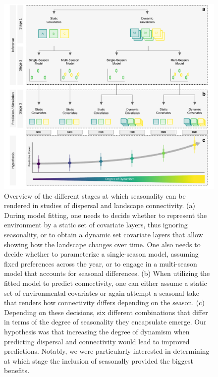 \documentclass[../FinalThesis.tex]{subfiles}
\begin{document}
\begin{figure}[htpb]
 \begin{center}
  \includegraphics[width = \textwidth]{Figures/GraphicalAbstract.pdf}
  \caption{Overview of the different stages at which seasonality can be rendered
  in studies of dispersal and landscape connectivity. (a) During model fitting,
  one needs to decide whether to represent the environment by a static set of
  covariate layers, thus ignoring seasonality, or to obtain a dynamic set
  covariate layers that allow showing how the landscape changes over time. One
  also needs to decide whether to parameterize a single-season model, assuming
  fixed preferences across the year, or to engage in a multi-season model that
  accounts for seasonal differences. (b) When utilizing the fitted model to
  predict connectivity, one can either assume a static set of environmental
  covariates or again attempt a seasonal take that renders how connectivity
  differs depending on the season. (c) Depending on these decisions, six
  different combinations that differ in terms of the degree of seasonality they
  encapsulate emerge. Our hypothesis was that increasing the degree of dynamism
  when predicting dispersal and connectivity would lead to improved predictions.
  Notably, we were particularly interested in determining at which stage the
  inclusion of seasonally provided the biggest benefits.}
  \label{GraphicalAbstractCH3}
 \end{center}
\end{figure}
\end{document}
